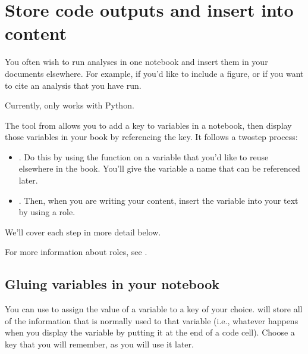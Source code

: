 \documentclass[letterpaper,10pt,english]{jupyterBook}
\begin{document}
\sphinxstepscope


\chapter{Store code outputs and insert into content}
\label{\detokenize{overview:store-code-outputs-and-insert-into-content}}\label{\detokenize{overview:content-code-outputs-glue}}\label{\detokenize{overview::doc}}
\sphinxAtStartPar
You often wish to run analyses in one notebook and insert them in your
documents elsewhere. For example, if you’d like to include a figure,
or if you want to cite an analysis that you have run.

\begin{sphinxShadowBox}
\sphinxstylesidebartitle{}

\sphinxAtStartPar
Currently,  only works with Python.
\end{sphinxShadowBox}

\sphinxAtStartPar
The  tool from 
allows you to add a key to variables in a notebook,
then display those variables in your book by referencing the key. It
follows a two\sphinxhyphen{}step process:
\begin{itemize}
\item {} 
\sphinxAtStartPar
{}. Do this by using
the  function on a variable
that you’d like to re\sphinxhyphen{}use elsewhere in the book. You’ll give the variable
a name that can be referenced later.

\item {} 
\sphinxAtStartPar
{}. Then, when you are
writing your content, insert the variable into your text by using a
 role.

\end{itemize}

\sphinxAtStartPar
We’ll cover each step in more detail below.

\begin{sphinxShadowBox}
\sphinxstylesidebartitle{}

\sphinxAtStartPar
For more information about roles, see .
\end{sphinxShadowBox}


\section{Gluing variables in your notebook}
\label{\detokenize{overview:gluing-variables-in-your-notebook}}\label{\detokenize{overview:glue-gluing}}
\sphinxAtStartPar
You can use  to assign the value of a variable to
a key of your choice.  will store all of the information that is normally used to 
that variable (i.e., whatever happens when you display the variable by putting it at the end of a
code cell). Choose a key that you will remember, as you will use it later.
\end{document}
